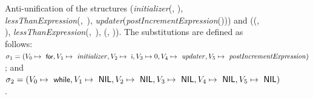 \begin{figure}[!h]
\centering{}
\caption[Complex anti-unification of two structures demonstrating a \protect\NIL{}-theory.]{Anti-unification of the structures (\textit{initializer}(, ), \mbox{\textit{lessThanExpression}(, ),} \textit{updater}(\textit{postIncrementExpression}())) and (\NIL{}(\NIL{}, \NIL{}), \mbox{\textit{lessThanExpression}(, ),} \NIL{}(\NIL{}, \NIL{})). The substitutions are defined as follows: $\sigma_1 = (V_0 \mapsto \text{ \textsf{\small for}}, V_1 \mapsto \text{ \textit{initializer}}, V_2 \mapsto \text{ \textsf{\small i}}, V_3 \mapsto 0, V_4 \mapsto \text{ \textit{updater}}, V_5 \mapsto \text{ \textit{postIncrementExpression}})$; and $\sigma_2 = (V_0 \mapsto \text{ \textsf{\small while}}, V_1 \mapsto \text{ \textsf{NIL}}, V_2 \mapsto \text{ \textsf{NIL}}, V_3 \mapsto \text{ \textsf{NIL}}, V_4 \mapsto \text{ \textsf{NIL}}, V_5 \mapsto \text{ \textsf{NIL}})$.\label{fig:for-while}}
\end{figure}



